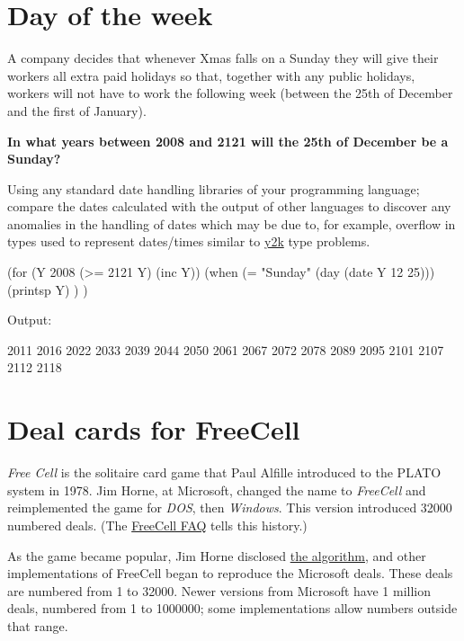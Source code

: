\pagebreak{}
\section*{Day of the week}

A company decides that whenever Xmas falls on a Sunday they will give
their workers all extra paid holidays so that, together with any public
holidays, workers will not have to work the following week (between the
25th of December and the first of January).

\textbf{In what years between 2008 and 2121 will the 25th of December be
a Sunday?}

Using any standard date handling libraries of your programming language;
compare the dates calculated with the output of other languages to
discover any anomalies in the handling of dates which may be due to, for
example, overflow in types used to represent dates/times similar to
\href{http://en.wikipedia.org/wiki/Y2k\#See\_also}{y2k} type problems.


\begin{wideverbatim}

(for (Y 2008 (>= 2121 Y) (inc Y))
   (when (= "Sunday" (day (date Y 12 25)))
      (printsp Y) ) )

Output:

2011 2016 2022 2033 2039 2044 2050 2061 2067 2072 2078 2089 2095 2101 2107 2112 2118

\end{wideverbatim}

\pagebreak{}
\section*{Deal cards for FreeCell}

\emph{Free Cell} is the solitaire card game that Paul Alfille
introduced to the PLATO system in 1978. Jim Horne, at Microsoft,
changed the name to \emph{FreeCell} and reimplemented the game for
\emph{DOS}, then \emph{Windows}. This version introduced 32000
numbered deals. (The
\href{http://www.solitairelaboratory.com/fcfaq.html}{FreeCell FAQ}
tells this history.)

As the game became popular, Jim Horne disclosed
\href{http://www.solitairelaboratory.com/mshuffle.txt}{the algorithm},
and other implementations of FreeCell began to reproduce the Microsoft
deals. These deals are numbered from 1 to 32000. Newer versions from
Microsoft have 1 million deals, numbered from 1 to 1000000; some
implementations allow numbers outside that range.

